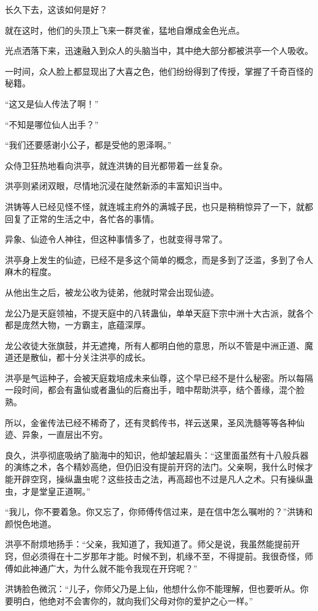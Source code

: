 \begin{this_body}
长久下去，这该如何是好？

就在这时，他们的头顶上飞来一群灵雀，猛地自爆成金色光点。

光点洒落下来，迅速融入到众人的头脑当中，其中绝大部分都被洪亭一个人吸收。

一时间，众人脸上都显现出了大喜之色，他们纷纷得到了传授，掌握了千奇百怪的秘籍。

“这又是仙人传法了啊！”

“不知是哪位仙人出手？”

“我们还要感谢小公子，都是受他的恩泽啊。”

众侍卫狂热地看向洪亭，就连洪铸的目光都带着一丝复杂。

洪亭则紧闭双眼，尽情地沉浸在陡然新添的丰富知识当中。

洪铸等人已经见怪不怪，就连城主府外的满城子民，也只是稍稍惊异了一下，就都回复了正常的生活之中，各忙各的事情。

异象、仙迹令人神往，但这种事情多了，也就变得寻常了。

洪亭身上发生的仙迹，已经不是多这个简单的概念，而是多到了泛滥，多到了令人麻木的程度。

从他出生之后，被龙公收为徒弟，他就时常会出现仙迹。

龙公乃是天庭领袖，不提天庭中的八转蛊仙，单单天庭下宗中洲十大古派，就各个都是庞然大物，一方霸主，底蕴深厚。

龙公收徒大张旗鼓，并无遮掩，所有人都明白他的意思，所以不管是中洲正道、魔道还是散仙，都十分关注洪亭的成长。

洪亭是气运种子，会被天庭栽培成未来仙尊，这个早已经不是什么秘密。所以每隔一段时间，都会有蛊仙或者蛊仙的后裔出手，暗中帮助洪亭，结个善缘，混个脸熟。

所以，金雀传法已经不稀奇了，还有灵鹤传书，祥云送果，圣风洗髓等等各种仙迹、异象，一直层出不穷。

良久，洪亭彻底吸纳了脑海中的知识，他却皱起眉头：“这里面虽然有十八般兵器的演练之术，各个精妙高绝，但仍旧没有提前开窍的法门。父亲啊，我什么时候才能开辟空窍，操纵蛊虫呢？这些技击之法，再高超也不过是凡人之术。只有操纵蛊虫，才是堂皇正道啊。”

“我儿，你不要着急。你又忘了，你师傅传信过来，是在信中怎么嘱咐的？”洪铸和颜悦色地道。

洪亭不耐烦地扬手：“父亲，我知道了，我知道了。师父是说，我虽然能提前开窍，但必须得在十二岁那年才能。时候不到，机缘不至，不得提前。我很奇怪，师傅如此神通广大，为什么就不能令我现在开窍呢？”

洪铸脸色微沉：“儿子，你师父乃是上仙，他想什么你不能理解，但也要听从。你要明白，他绝对不会害你的，就向我们父母对你的爱护之心一样。”


\end{this_body}
